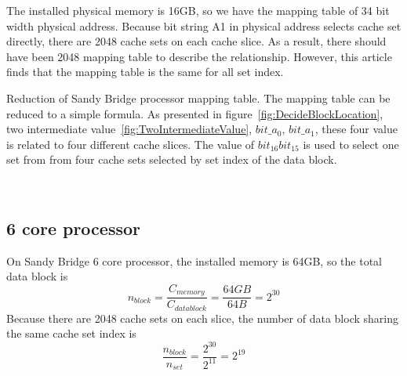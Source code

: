 \documentclass[conference]{IEEEtran}
\newcommand{\WordMemory}{memory}
\newcommand{\MemoryCapacity}{C_{\WordMemory}}
\newcommand{\WordDataBlock}{data block }
\newcommand{\NumberBlock}{n_{block}}
\newcommand{\NUMSET}{n_{set}}
\newcommand{\SandyBridge}{Sandy Bridge }
\begin{document}
The installed physical memory is 16GB, so we have the mapping table of 34 bit width physical address. Because bit string A1 in physical address selects cache set directly, there are 2048 cache sets on each cache slice. As a result, there should have been 2048 mapping table to describe the relationship. However, this article finds that the mapping table is the same for all set index. 

Reduction of \SandyBridge processor mapping table. The mapping table can be reduced to a simple formula. 
As presented in figure~\ref{fig:DecideBlockLocation}, two intermediate value~\ref{fig:TwoIntermediateValue}, $bit\_a_0$, $bit\_a_1$, these four value is related to four different cache slices. The value of $bit_{16}bit_{15}$ is used to select one set from from four cache sets selected by set index of the data block. 
\begin{figure*}[!htbp]
\centering
{}
	~
	\caption{Intel Sandy Bridge 4 core processor hash fucntion cracking result.}
\end{figure*}
\subsection{6 core processor}
On \SandyBridge 6 core processor, the installed memory is 64GB, so the total data block is 
\begin{equation}
	\NumberBlock = \frac{\MemoryCapacity}{C_{\WordDataBlock}} = \frac{64 GB}{64 B} = 2^{30}
\end{equation}
Because there are 2048 cache sets on each slice, the number of data block sharing the same cache set index is 
\begin{equation}
	\frac{\NumberBlock}{\NUMSET} = \frac{2^{30}}{2^{11}} = 2^{19} 
\end{equation}
\end{document}
